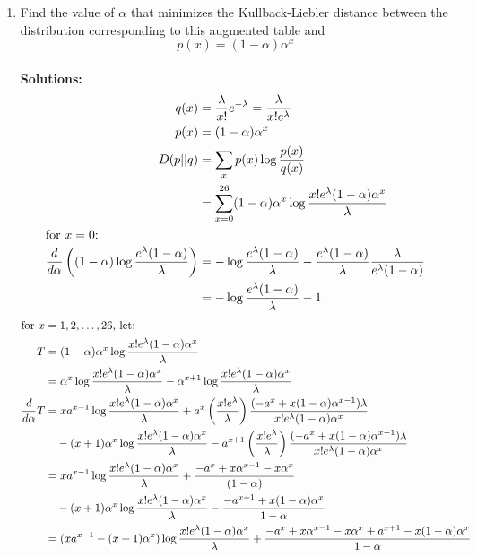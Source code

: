 \documentclass{assignment}
\begin{document}
\begin{enumerate}
\begin{enumerate}
  \item Find the value of $\alpha$ that minimizes the Kullback-Liebler distance between the distribution corresponding
    to this augmented table and
    $$p(x) = (1-\alpha) \alpha^x $$ \\
    \textbf{Solutions:}\\
    \begin{align*}
      q(x) & = \dfrac{\lambda}{x!}e^{-\lambda} = \dfrac{\lambda}{x! e^{\lambda}} \\
      p(x) & = (1-\alpha) \alpha^x \\
      D(p||q) & = \sum_x p(x)\log \dfrac{p(x)}{q(x)}\\
           & = \sum_{x=0}^{26} (1-\alpha) \alpha^x \log \dfrac{x!e^{\lambda}(1-\alpha) \alpha^x}{\lambda} \\
      \shortintertext{for $x=0$:}
      \dfrac{d}{d\alpha}\left((1-\alpha) \log\dfrac{e^{\lambda}(1 - \alpha)}{\lambda}\right)
           & = -\log\dfrac{e^{\lambda}(1 - \alpha)}{\lambda}
             - \dfrac{e^{\lambda}(1 - \alpha)}{\lambda} \dfrac{\lambda}{e^{\lambda}(1 - \alpha)} \\
           & = -\log\dfrac{e^{\lambda}(1 - \alpha)}{\lambda} - 1 \\
     \end{align*}
     \begin{align*}
      \shortintertext{for $x = 1, 2, \dots, 26$, let:}
      T & = (1-\alpha) \alpha^x \log \dfrac{x!e^{\lambda}(1-\alpha) \alpha^x}{\lambda} \\
           & = \alpha^x\log \dfrac{x!e^{\lambda}(1-\alpha) \alpha^x}{\lambda} -
             \alpha^{x+1}\log \dfrac{x!e^{\lambda}(1-\alpha) \alpha^x}{\lambda} \\
      \dfrac{d}{d\alpha} T
           & = xa^{x-1}\log \dfrac{x!e^{\lambda}(1-\alpha) \alpha^x}{\lambda}
             + a^x \left( \dfrac{x!e^{\lambda}}{\lambda} \right)
             \dfrac{(-a^x + x(1 - \alpha)\alpha^{x-1})\lambda}{x!e^{\lambda}(1-\alpha) \alpha^x} \\
           & \quad - (x+1)\alpha^x\log \dfrac{x!e^{\lambda}(1-\alpha) \alpha^x}{\lambda}
             - a^{x+1} \left( \dfrac{x!e^{\lambda}}{\lambda} \right)
             \dfrac{(-a^x + x(1 - \alpha)\alpha^{x-1})\lambda}{x!e^{\lambda}(1-\alpha) \alpha^x} \\
           & = xa^{x-1}\log \dfrac{x!e^{\lambda}(1-\alpha) \alpha^x}{\lambda}
             + \dfrac{-a^x + x \alpha^{x-1} - x\alpha^x}{(1-\alpha)} \\
           & \quad - (x+1)\alpha^x\log \dfrac{x!e^{\lambda}(1-\alpha) \alpha^x}{\lambda}
             - \dfrac{-a^{x+1} + x(1 - \alpha)\alpha^{x}}{1-\alpha} \\
           & = (x a^{x-1} - (x+1) \alpha^x)\log \dfrac{x!e^{\lambda}(1-\alpha) \alpha^x}{\lambda}
             + \dfrac{-a^x + x \alpha^{x-1} - x\alpha^x + a^{x+1} - x(1 - \alpha)\alpha^{x}}{1-\alpha}
    \end{align*}


\end{enumerate}
\end{enumerate}
\end{document}
